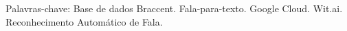 \begin{resumo}[RESUMO]
Palavras-chave: Base de dados Braccent. Fala-para-texto. Google Cloud. Wit.ai. Reconhecimento Automático de Fala.



\end{resumo}
    